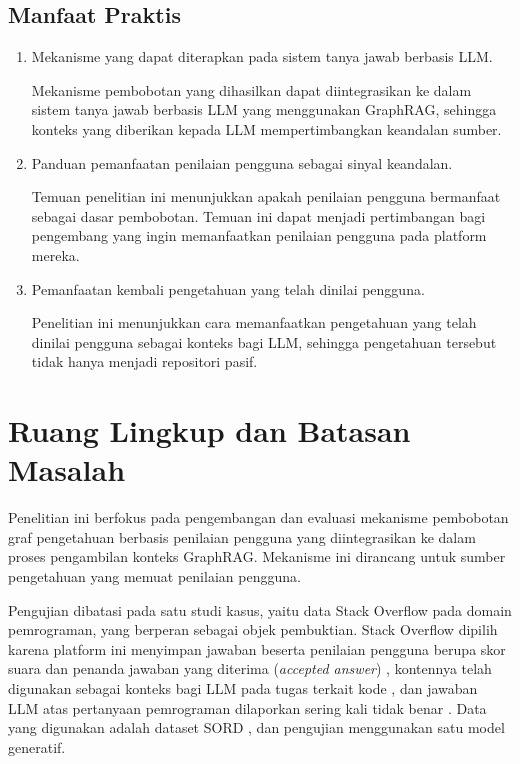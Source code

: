 \subsection*{Manfaat Praktis}

\begin{enumerate}
    \item Mekanisme yang dapat diterapkan pada sistem tanya jawab berbasis LLM.

    Mekanisme pembobotan yang dihasilkan dapat diintegrasikan ke dalam sistem tanya jawab berbasis LLM yang menggunakan GraphRAG, sehingga konteks yang diberikan kepada LLM mempertimbangkan keandalan sumber.

    \item Panduan pemanfaatan penilaian pengguna sebagai sinyal keandalan.

    Temuan penelitian ini menunjukkan apakah penilaian pengguna bermanfaat sebagai dasar pembobotan. Temuan ini dapat menjadi pertimbangan bagi pengembang yang ingin memanfaatkan penilaian pengguna pada platform mereka.

    \item Pemanfaatan kembali pengetahuan yang telah dinilai pengguna.

    Penelitian ini menunjukkan cara memanfaatkan pengetahuan yang telah dinilai pengguna sebagai konteks bagi LLM, sehingga pengetahuan tersebut tidak hanya menjadi repositori pasif.
\end{enumerate}

\section{Ruang Lingkup dan Batasan Masalah}
\label{sec:ruang-lingkup}

Penelitian ini berfokus pada pengembangan dan evaluasi mekanisme pembobotan graf pengetahuan berbasis penilaian pengguna yang diintegrasikan ke dalam proses pengambilan konteks GraphRAG. Mekanisme ini dirancang untuk sumber pengetahuan yang memuat penilaian pengguna.

Pengujian dibatasi pada satu studi kasus, yaitu data Stack Overflow pada domain pemrograman, yang berperan sebagai objek pembuktian. Stack Overflow dipilih karena platform ini menyimpan jawaban beserta penilaian pengguna berupa skor suara dan penanda jawaban yang diterima (\emph{accepted answer}) \autocite{Kleybolte2026}, kontennya telah digunakan sebagai konteks bagi LLM pada tugas terkait kode \autocite{Nashid2023}, dan jawaban LLM atas pertanyaan pemrograman dilaporkan sering kali tidak benar \autocite{Kabir2024}. Data yang digunakan adalah dataset SORD \autocite{Fatima2026}, dan pengujian menggunakan satu model generatif.

